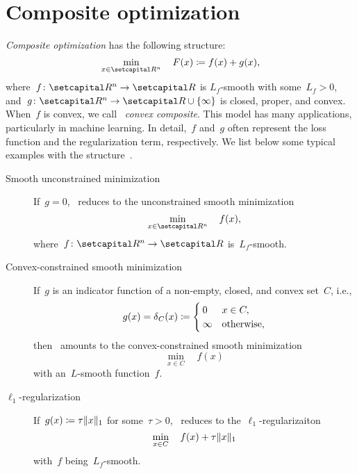 \documentclass[../../main]{subfiles}
\begin{document}
\section{Composite optimization} 
\emph{Composite optimization} has the following structure:
\begin{equation} \label{eq:composite}
    \min_{x \in \setR^n} \quad F(x) \coloneqq f(x) + g(x)
,\end{equation} 
where~$f \colon \setR^n \to \setR$ is $L_f$-smooth with some~$L_f > 0$, and~$g \colon \setR^n \to \setR \cup \set{\infty}$ is closed, proper, and convex.
When~$f$ is convex, we call~ \emph{convex composite}.
This model has many applications, particularly in machine learning.
In detail,~$f$ and~$g$ often represent the loss function and the regularization term, respectively.
We list below some typical examples with the structure~.

\begin{example} 
    \begin{description}
        \item[Smooth unconstrained minimization] If~$g = 0$,~ reduces to the unconstrained smooth minimization
            \begin{equation}
                \min_{x \in \setR^n} \quad f(x)
            ,\end{equation} 
            where~$f \colon \setR^n \to \setR$ is~$L_f$-smooth.
        \item[Convex-constrained smooth minimization] If~$g$ is an indicator function of a non-empty, closed, and convex set~$C$, i.e.,
            \begin{equation} \label{eq:indicator}
                g(x) = \operatorname{\delta}_C(x) \coloneqq
                \begin{cases}
                    0 & x \in C, \\
                    \infty & \text{otherwise},
                \end{cases}
            \end{equation} 
            then~ amounts to the convex-constrained smooth minimization
            \begin{equation}
                \min_{x \in C} \quad f(x)
            \end{equation} 
            with an~$L$-smooth function~$f$.
        \item[$\ell_1$-regularization] If~$g(x) \coloneqq \tau \lVert x\rVert_1$ for some~$\tau > 0$,~ reduces to the~$\ell_1$-regularizaiton
            \begin{equation}
                \min_{x \in C} \quad f(x) + \tau \lVert x\rVert_1
            \end{equation} 
            with~$f$ being~$L_f$-smooth.
    \end{description}
\end{example}




\end{document}
